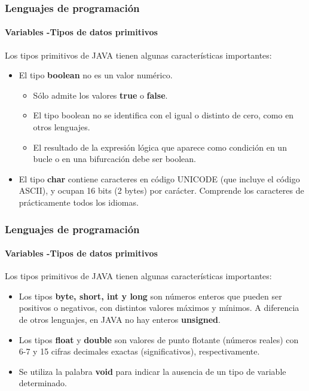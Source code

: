 \documentclass{beamer}
\begin{document}
\begin{frame}
  \frametitle{Lenguajes de programación} 
  \framesubtitle{Variables -Tipos de datos primitivos}

  Los tipos primitivos de JAVA tienen algunas características importantes:

  \begin{itemize}
  \item El tipo \textbf{boolean} no es un valor numérico.
    \begin{itemize}
    \item Sólo admite los valores \textbf{true} o \textbf{false}. 
    \item El tipo boolean no se identifica con el igual o distinto de cero, como en otros lenguajes.
    \item El resultado de la expresión lógica que aparece como condición en un bucle o en una bifurcación debe ser boolean.
    \end{itemize}
  \item El tipo \textbf{char} contiene caracteres en código UNICODE (que incluye el código ASCII), y ocupan 16 bits (2 bytes) por carácter. Comprende los caracteres de prácticamente todos los idiomas.
  \end{itemize}
\end{frame}

\begin{frame}
  \frametitle{Lenguajes de programación} 
  \framesubtitle{Variables -Tipos de datos primitivos}

  Los tipos primitivos de JAVA tienen algunas características importantes:

  \begin{itemize}
  \item Los tipos \textbf{byte, short, int y long} son números enteros que pueden ser positivos o negativos, con distintos valores máximos y mínimos. A diferencia de otros lenguajes, en JAVA no hay enteros \textbf{unsigned}.
  \item Los tipos \textbf{float} y \textbf{double} son valores de punto flotante (números reales) con 6-7 y 15 cifras decimales exactas (significativos), respectivamente.
  \item Se utiliza la palabra 	\textbf{void} para indicar la ausencia de un tipo de variable determinado.
  \end{itemize}
\end{frame}
\end{document}
